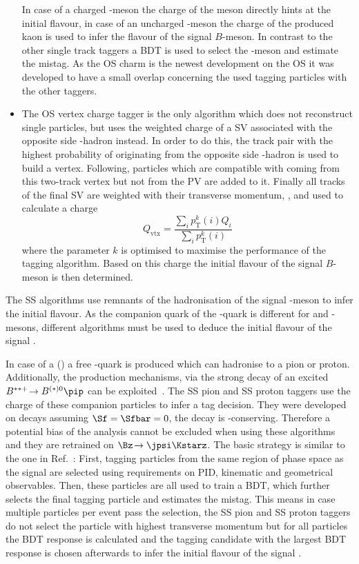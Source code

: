 \begin{itemize}
	In case of a charged \D-meson the charge of the meson directly hints at the initial flavour, in case of an uncharged \D-meson the charge of the produced kaon is used to infer the flavour of the signal $B$-meson.
	In contrast to the other single track taggers a \ac{BDT} is used to select the \D-meson and estimate the mistag.
	As the OS charm is the newest development on the OS it was developed to have a small overlap concerning the used tagging particles with the other taggers.
	\item The OS vertex charge tagger is the only algorithm which does not reconstruct single particles, but uses the weighted charge of a \ac{SV} associated with the opposite side \bquark-hadron instead.
	In order to do this, the track pair with the highest probability of originating from the opposite side \bquark-hadron is used to build a vertex.
	Following, particles which are compatible with coming from this two-track vertex but not from the \ac{PV} are added to it.
	Finally all tracks of the final \ac{SV} are weighted with their transverse momentum, \pt, and used to calculate a charge
	\begin{equation}
	Q_{\text{vtx}}=\frac{\sum_{i}p_{\mathrm T}^k(i)Q_i}{\sum_{i}p_{\mathrm T}^k(i)}
	\end{equation}
	where the parameter $k$ is optimised to maximise the performance of the tagging algorithm.
	Based on this charge the initial flavour of the signal $B$-meson is then determined.
\end{itemize}

The SS algorithms use remnants of the hadronisation of the signal \B-meson to infer the initial flavour.
As the companion quark of the \bquark-quark is different for \Bz and \Bs-mesons, different algorithms must be used to deduce the initial flavour of the signal \B.

In case of a \Bz (\bquarkbar\dquark) a free \dquarkbar-quark is produced which can hadronise to a pion or proton.
Additionally, the production mechanisms, \eg via the strong decay of an excited $B^{**+}\!\to B^{(*)0}\pip$ can be exploited~\cite{Aaij:2016rdg}.
The SS pion and SS proton taggers use the charge of these companion particles to infer a tag decision.
They were developed on \BdToDpi decays assuming $\Sf=\Sfbar=0$, \ie the decay \BdToDpi is \CP-conserving.
Therefore a potential bias of the analysis cannot be excluded when using these algorithms and they are retrained on $\Bz\!\to\jpsi\Kstarz$.
The basic strategy is similar to the one in Ref.~\cite{Aaij:2016rdg}:
First, tagging particles from the same region of phase space as the signal \B are selected using requirements on PID, kinematic and geometrical observables.
Then, these particles are all used to train a \ac{BDT}, which further selects the final tagging particle and estimates the mistag.
This means in case multiple particles per event pass the selection, the SS pion and SS proton taggers do not select the particle with highest transverse momentum but for all particles the \ac{BDT} response is calculated and the tagging candidate with the largest \ac{BDT} response is chosen afterwards to infer the initial flavour of the signal \B.

